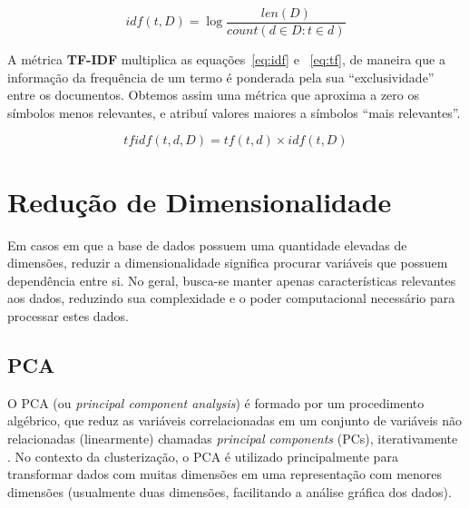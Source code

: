 \begin{equation}\label{eq:idf}
idf(t, D) = \log \frac{len(D)}{count(d \in D : t \in d)}
\end{equation}


A métrica \textbf{TF-IDF} multiplica as equações~\ref{eq:idf} e ~\ref{eq:tf}, de maneira que a informação da frequência de um termo é ponderada pela sua ``exclusividade'' entre os documentos.
Obtemos assim uma métrica que aproxima a zero os símbolos menos relevantes, e atribuí valores maiores a símbolos ``mais relevantes''.

\begin{equation}
tfidf(t, d, D) = tf(t, d) \times idf(t, D)
\end{equation}

 \section{Redução de Dimensionalidade}
 Em casos em que a base de dados possuem uma quantidade elevadas de dimensões, 
reduzir a dimensionalidade significa procurar variáveis que possuem dependência entre si.
No geral, busca-se manter apenas características relevantes aos dados, reduzindo sua complexidade e o poder computacional necessário para processar estes dados.

 \subsection{PCA}
 O PCA (ou \emph{principal component analysis}) é formado por um procedimento algébrico, 
 que reduz as variáveis correlacionadas em um conjunto de variáveis não relacionadas (linearmente) chamadas \emph{principal components} (PCs), iterativamente \cite{Jolliffe}.
 No contexto da clusterização, o PCA é utilizado principalmente para transformar dados com muitas dimensões em uma representação com menores dimensões (usualmente duas dimensões, facilitando a análise gráfica dos dados).
 
 
